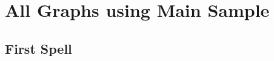 \documentclass[12pt,letterpaper]{article}
\begin{document}

\clearpage
\newpage

\section{All Graphs using Main Sample}

\setcounter{figure}{0}
\setcounter{table}{0}





\subsection{First Spell}
\end{document}
